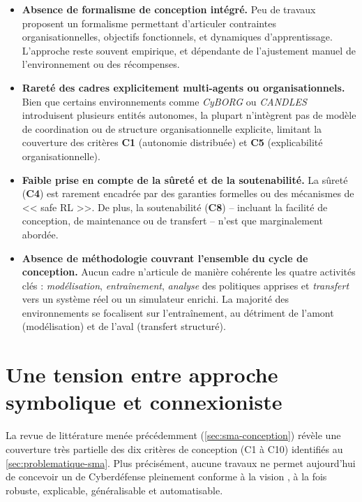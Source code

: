 \begin{itemize}
    \item \textbf{Absence de formalisme de conception intégré.} Peu de travaux proposent un formalisme permettant d’articuler contraintes organisationnelles, objectifs fonctionnels, et dynamiques d’apprentissage. L’approche reste souvent empirique, et dépendante de l’ajustement manuel de l’environnement ou des récompenses.

    \item \textbf{Rareté des cadres explicitement multi-agents ou organisationnels.} Bien que certains environnements comme \emph{CyBORG} ou \emph{CANDLES} introduisent plusieurs entités autonomes, la plupart n’intègrent pas de modèle de coordination ou de structure organisationnelle explicite, limitant la couverture des critères \textbf{C1} (autonomie distribuée) et \textbf{C5} (explicabilité organisationnelle).

    \item \textbf{Faible prise en compte de la sûreté et de la soutenabilité.} La sûreté (\textbf{C4}) est rarement encadrée par des garanties formelles ou des mécanismes de << safe RL >>. De plus, la soutenabilité (\textbf{C8}) -- incluant la facilité de conception, de maintenance ou de transfert -- n’est que marginalement abordée.

    \item \textbf{Absence de méthodologie couvrant l’ensemble du cycle de conception.} Aucun cadre n’articule de manière cohérente les quatre activités clés : \emph{modélisation}, \emph{entraînement}, \emph{analyse} des politiques apprises et \emph{transfert} vers un système réel ou un simulateur enrichi. La majorité des environnements se focalisent sur l'entraînement, au détriment de l’amont (modélisation) et de l’aval (transfert structuré).
\end{itemize}


\section{Une tension entre approche symbolique et connexioniste}\label{sec:limits-existing}

La revue de littérature menée précédemment (\autoref{sec:sma-conception}) révèle une couverture très partielle des dix critères de conception (C1 à C10) identifiés au \autoref{sec:problematique-sma}. Plus précisément, aucune travaux ne permet aujourd'hui de concevoir un  de Cyberdéfense pleinement conforme à la vision , à la fois robuste, explicable, généralisable et automatisable.

